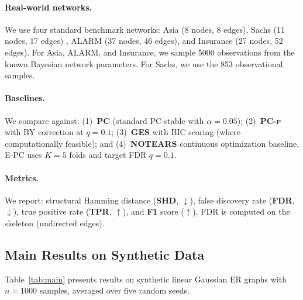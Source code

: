 \documentclass[11pt]{article}
\newcommand{\epc}{\textsc{E-PC}}
\newcommand{\pcp}{\textsc{PC-p}}
\begin{document}
\paragraph{Real-world networks.}
We use four standard benchmark networks: Asia (8 nodes, 8 edges), Sachs (11 nodes, 17 edges) \citep{sachs2005causal}, ALARM (37 nodes, 46 edges), and Insurance (27 nodes, 52 edges). For Asia, ALARM, and Insurance, we sample 5000 observations from the known Bayesian network parameters. For Sachs, we use the 853 observational samples.

\paragraph{Baselines.}
We compare against: (1)~\textbf{PC} (standard PC-stable \citep{colombo2014order} with $\alpha = 0.05$); (2)~\textbf{\pcp{}} \citep{strobl2019estimating} with BY correction at $q = 0.1$; (3)~\textbf{GES} \citep{chickering2002optimal} with BIC scoring (where computationally feasible); and (4)~\textbf{NOTEARS} \citep{zheng2018dags} continuous optimization baseline. \epc{} uses $K = 5$ folds and target FDR $q = 0.1$.

\paragraph{Metrics.}
We report: structural Hamming distance (\textbf{SHD}, $\downarrow$), false discovery rate (\textbf{FDR}, $\downarrow$), true positive rate (\textbf{TPR}, $\uparrow$), and \textbf{F1} score ($\uparrow$). FDR is computed on the skeleton (undirected edges).

\subsection{Main Results on Synthetic Data}

Table~\ref{tab:main} presents results on synthetic linear Gaussian ER graphs with $n = 1000$ samples, averaged over five random seeds.
\end{document}

